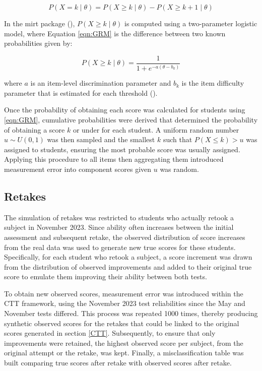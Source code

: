 \documentclass[12pt]{article}
\begin{document}
\begin{equation}
\label{eqn:GRM}
P(X=k\mid\theta)=P(X\geq k\mid\theta)-P(X\geq k+1\mid\theta)
\end{equation}

In the mirt package (\cite{chalmersMirtMultidimensionalItem2012}), $P(X\geq k\mid \theta)$ is computed using a two-parameter logistic model, where Equation \ref{eqn:GRM} is the difference between two known probabilities given by:

\begin{equation}
P(X\geq k\mid\theta)=\frac{1}{1+e^{-a\left(\theta-b_k\right)}}
\end{equation}

\noindent
where $a$ is an item-level discrimination parameter and $b_k$ is the item difficulty parameter that is estimated for each threshold (\cite{zeinGettingStartedGraded2025}).

Once the probability of obtaining each score was calculated for students using \ref{eqn:GRM}, cumulative probabilities were derived that determined the probability of obtaining a score $k$ or under for each student. A uniform random number $u\sim U(0,1)$ was then sampled and the smallest $k$ such that $P(X\leq k)> u$ was assigned to students, ensuring the most probable score was usually assigned. Applying this procedure to all items then aggregating them introduced measurement error into component scores given $u$ was random.

\subsection{Retakes}

The simulation of retakes was restricted to students who actually retook a subject in November 2023. Since ability often increases between the initial assessment and subsequent retake, the observed distribution of score increases from the real data was used to generate new true scores for these students. Specifically, for each student who retook a subject, a score increment was drawn from the distribution of observed improvements and added to their original true score to emulate them improving their ability between both tests.

To obtain new observed scores, measurement error was introduced within the CTT framework, using the November 2023 test reliabilities since the May and November tests differed. This process was repeated 1000 times, thereby producing synthetic observed scores for the retakes that could be linked to the original scores generated in section \ref{CTT}. Subsequently, to ensure that only improvements were retained, the highest observed score per subject, from the original attempt or the retake, was kept. Finally, a misclassification table was built comparing true scores after retake with observed scores after retake.
\end{document}
